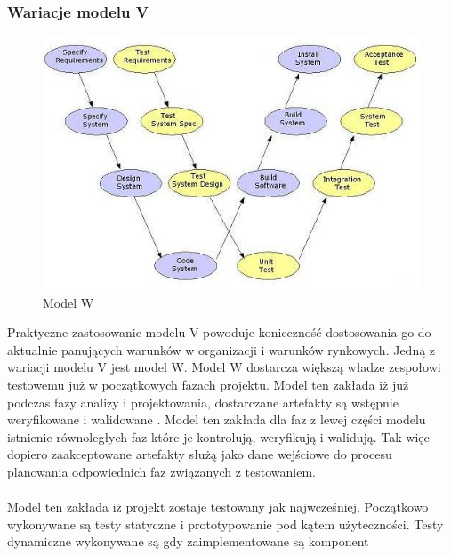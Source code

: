 \subsubsection{Wariacje modelu V}
\begin{figure}[h]
\centerline{\includegraphics[scale=0.5]{img/Wmodel3.JPG}}
\caption{Model W  \cite{wmodel}}
\label{fig:wmodel}
\end{figure}

Praktyczne zastosowanie modelu V powoduje konieczność dostosowania go do aktualnie panujących warunków w organizacji i warunków rynkowych. Jedną z wariacji modelu V jest model W. Model W dostarcza większą władze zespołowi testowemu już w początkowych fazach projektu. Model ten zakłada iż już podczas fazy analizy i projektowania, dostarczane artefakty są wstępnie weryfikowane i walidowane \cite{wmodel}. Model ten zakłada dla faz z lewej części modelu istnienie równoległych faz które je kontrolują, weryfikują i walidują. Tak więc dopiero zaakceptowane artefakty służą jako dane wejściowe do procesu planowania odpowiednich faz związanych z testowaniem.
\paragraph{}
Model ten zakłada iż projekt zostaje testowany jak najwcześniej. Początkowo wykonywane są testy statyczne i prototypowanie pod kątem użyteczności. Testy dynamiczne wykonywane są gdy zaimplementowane są komponent


